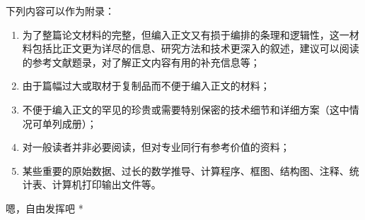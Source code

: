 \appendix

下列内容可以作为附录：

\begin{enumerate}[label=\arabic*)]
\item 为了整篇论文材料的完整，但编入正文又有损于编排的条理和逻辑性，这一材料包括比正文更为详尽的信息、研究方法和技术更深入的叙述，建议可以阅读的参考文献题录，对了解正文内容有用的补充信息等；
\item 由于篇幅过大或取材于复制品而不便于编入正文的材料；
\item 不便于编入正文的罕见的珍贵或需要特别保密的技术细节和详细方案（这中情况可单列成册）；
\item 对一般读者并非必要阅读，但对专业同行有参考价值的资料；
\item 某些重要的原始数据、过长的数学推导、计算程序、框图、结构图、注释、统计表、计算机打印输出文件等。
\end{enumerate}

\par * 嗯，自由发挥吧 * \par
